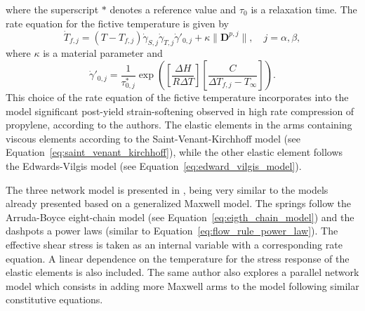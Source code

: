 where the superscript $*$ denotes a reference value and $\tau_0$ is a relaxation time.
The rate equation for the fictive temperature is given by
\begin{equation}
	\dot T_{f,j} = (T - T_{f,j})\dot\gamma_{S,j}\dot\gamma_{T,j}\dot\gamma'_{0,j} + \kappa \|\mathbf D^{p,j}\|,\quad j = \alpha, \beta,
\end{equation}
where $\kappa$ is a material parameter and
\begin{equation}
	\dot \gamma'_{0,j} = \frac{1}{\tau^*_{0,j}} \exp\left(\left[\frac{\Delta H}{R\Delta T}\right]\left[\frac{C}{\Delta T_{f,j} - T_\infty}\right]\right).
\end{equation}
This choice of the rate equation of the fictive temperature incorporates into the model significant post-yield strain-softening observed in high rate compression of propylene, according to the authors.
The elastic elements in the arms containing viscous elements according to the Saint-Venant-Kirchhoff model (see Equation~\eqref{eq:saint_venant_kirchhoff}), while the other elastic element follows the Edwards-Vilgis model (see Equation~\eqref{eq:edward_vilgis_model}).

The three network model is presented in \citep{bergstromMechanicsSolidPolymers2015}, being very similar to the models already presented based on a generalized Maxwell model.
The springs follow the Arruda-Boyce eight-chain model (see Equation~\eqref{eq:eigth_chain_model}) and the dashpots a power laws (similar to Equation~\eqref{eq:flow_rule_power_law}).
The effective shear stress is taken as an internal variable with a corresponding rate equation.
A linear dependence on the temperature for the stress response of the elastic elements is also included.
The same author also explores a parallel network model which consists in adding more Maxwell arms to the model following similar constitutive equations.

